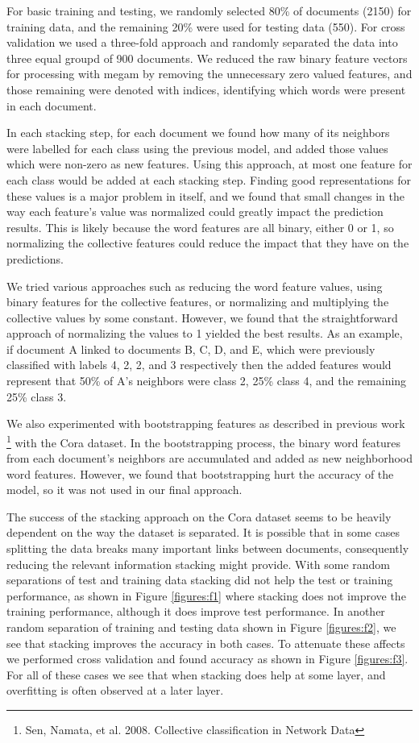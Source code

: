 \documentclass[a4paper,11pt]{article}
\begin{document}
For basic training and testing, we randomly selected 80\% of documents (2150) 
for training data, and the remaining 20\% were used for testing data (550).
For cross validation we used a three-fold approach and randomly separated 
the data into three equal groupd of 900 documents. 
We reduced the raw binary feature vectors for processing with megam
by removing the unnecessary zero valued features, and those remaining 
were denoted with indices, identifying which words were present in each document.

In each stacking step, for each document we found how many of its
neighbors were labelled for each class using the previous model, and added 
those values which were non-zero as new features. Using this approach,
at most one feature for each class would be added at each stacking step.
Finding good representations for these values is a major problem in itself,
and we found that small changes in the way each feature's value was normalized
could greatly impact the prediction results. This is likely because the word
features are all binary, either 0 or 1, so normalizing the collective features
could reduce the impact that they have on the predictions.

We tried various approaches such as reducing the word feature 
values, using binary features for the collective features, or normalizing 
and multiplying the collective values by some constant. However, we found
that the straightforward approach of normalizing the values to 1 yielded 
the best results. As an example, if document A linked to documents 
B, C, D, and E, which were previously classified with labels 4, 2, 2, and 3
respectively then the added features would represent that 50\% of A's neighbors 
were class 2, 25\% class 4, and the remaining 25\% class 3. 

We also experimented with bootstrapping features as described in previous work
\footnote{Sen, Namata, et al. 2008. Collective classification in Network Data}
with the Cora dataset. In the bootstrapping process, the binary word features from
each document's neighbors are accumulated and added as new neighborhood word features.
However, we found that bootstrapping hurt the accuracy of the model, so it 
was not used in our final approach.

The success of the stacking approach on the Cora dataset seems to be heavily
dependent on the way the dataset is separated. It is possible that in some 
cases splitting the data breaks many important links between documents,
consequently reducing the relevant information stacking might provide. 
With some random separations of test and training data stacking did not help
the test or training performance, as shown in Figure \ref{figures:f1} where
stacking does not improve the training performance, although it does improve
test performance. In another random separation of training and testing data 
shown in Figure \ref{figures:f2}, we see that stacking improves the accuracy 
in both cases. To attenuate these affects we performed cross validation and 
found accuracy as shown in Figure \ref{figures:f3}. For all of these cases we 
see that when stacking does help at some layer, and overfitting is often observed at a later layer.
\end{document}
